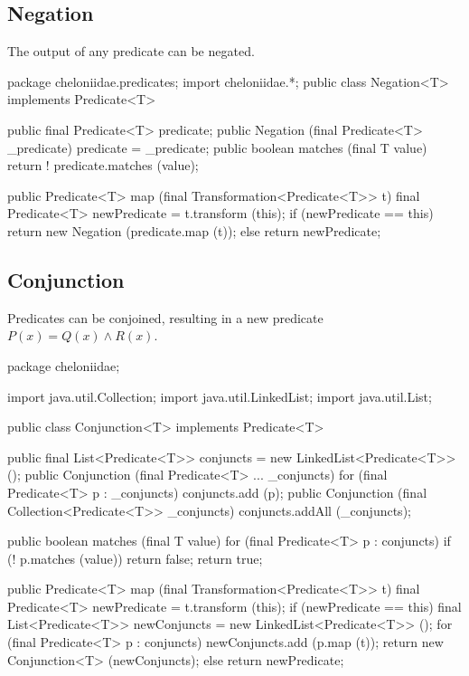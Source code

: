 \documentclass{report}
\begin{document}
\subsection {Negation} \label{sec:negation}
        The output of any predicate can be negated.

\begin{javacode}
package cheloniidae.predicates;
import cheloniidae.*;
public class Negation<T> implements Predicate<T> {
  public final Predicate<T> predicate;
  public Negation (final Predicate<T> _predicate) {predicate = _predicate;}
  public boolean matches (final T value) {return ! predicate.matches (value);}

  public Predicate<T> map (final Transformation<Predicate<T>> t) {
    final Predicate<T> newPredicate = t.transform (this);
    if (newPredicate == this) return new Negation (predicate.map (t));
    else                      return newPredicate;
  }
}
\end{javacode}

\subsection {Conjunction} \label{sec:conjunction}
        Predicates can be conjoined, resulting in a new predicate $P(x) = Q(x) \wedge R(x)$.

\begin{javacode}
package cheloniidae;

import java.util.Collection;
import java.util.LinkedList;
import java.util.List;

public class Conjunction<T> implements Predicate<T> {
  public final List<Predicate<T>> conjuncts = new LinkedList<Predicate<T>> ();
  public Conjunction (final Predicate<T> ... _conjuncts)
    {for (final Predicate<T> p : _conjuncts) conjuncts.add (p);}
  public Conjunction (final Collection<Predicate<T>> _conjuncts) {conjuncts.addAll (_conjuncts);}

  public boolean matches (final T value) {
    for (final Predicate<T> p : conjuncts) if (! p.matches (value)) return false;
    return true;
  }

  public Predicate<T> map (final Transformation<Predicate<T>> t) {
    final Predicate<T> newPredicate = t.transform (this);
    if (newPredicate == this) {
      final List<Predicate<T>> newConjuncts = new LinkedList<Predicate<T>> ();
      for (final Predicate<T> p : conjuncts) newConjuncts.add (p.map (t));
      return new Conjunction<T> (newConjuncts);
    } else return newPredicate;
  }
}
\end{javacode}
\end{document}
